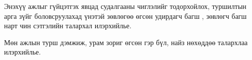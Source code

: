 
\begin{acknowledgements}
\addchaptertocentry{\acknowledgementname}

Энэхүү ажлыг гүйцэтгэх явцад судалгааны чиглэлийг тодорхойлох, туршилтын арга зүйг боловсруулахад үнэтэй
зөвлөгөө өгсөн удирдагч багш \supname, зөвлөгч багш \advicenameA{} нарт чин сэтгэлийн талархал илэрхийлье.

Мөн ажлын турш дэмжиж, урам зориг өгсөн гэр бүл, найз нөхөддөө талархлаа илэрхийлье.

\end{acknowledgements}

